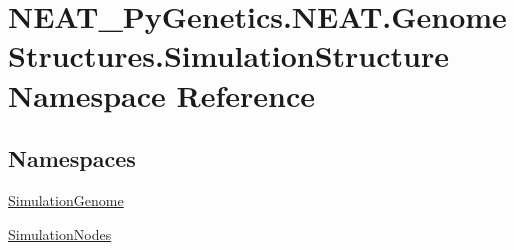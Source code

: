 \hypertarget{namespaceNEAT__PyGenetics_1_1NEAT_1_1GenomeStructures_1_1SimulationStructure}{}\section{N\+E\+A\+T\+\_\+\+Py\+Genetics.\+N\+E\+A\+T.\+Genome\+Structures.\+Simulation\+Structure Namespace Reference}
\label{namespaceNEAT__PyGenetics_1_1NEAT_1_1GenomeStructures_1_1SimulationStructure}
\subsection*{Namespaces}
\begin{DoxyCompactItemize}
\item 
 \hyperlink{namespaceNEAT__PyGenetics_1_1NEAT_1_1GenomeStructures_1_1SimulationStructure_1_1SimulationGenome}{Simulation\+Genome}
\item 
 \hyperlink{namespaceNEAT__PyGenetics_1_1NEAT_1_1GenomeStructures_1_1SimulationStructure_1_1SimulationNodes}{Simulation\+Nodes}
\end{DoxyCompactItemize}
